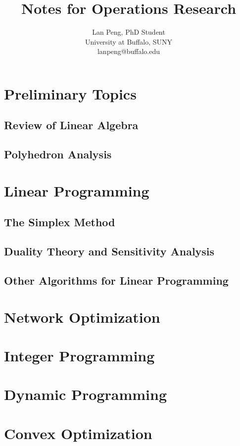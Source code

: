 \documentclass[10pt, twocolumn]{book}
\author{Lan Peng, PhD Student\\University at Buffalo, SUNY\\lanpeng@buffalo.edu}
\title{Notes for Operations Research}
\begin{document}
\maketitle
\tableofcontents

\part{Preliminary Topics}
	\chapter{Review of Linear Algebra}

	\chapter{Polyhedron Analysis}
	
\part{Linear Programming}
	\chapter{The Simplex Method}

	\chapter{Duality Theory and Sensitivity Analysis}

	\chapter{Other Algorithms for Linear Programming}

\part{Network Optimization}

\part{Integer Programming}

\part{Dynamic Programming}

\part{Convex Optimization}
\end{document}
